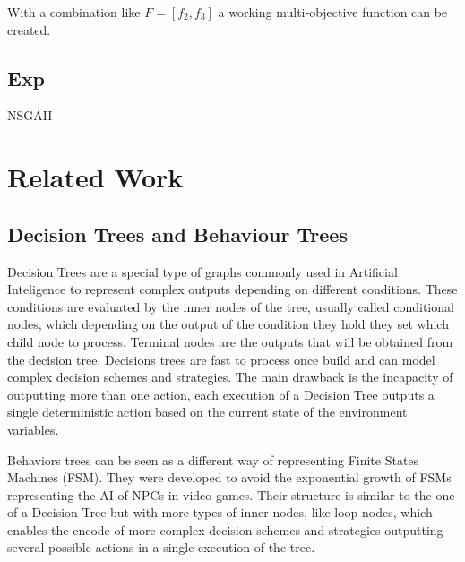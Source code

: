 \documentclass{llncs}
\begin{document}
With a combination like $F = [f_2, f_3]$ a working multi-objective function can be created.

\subsection{Exp}
NSGAII

%
\section{Related Work}
\label{sec:relatedWork}
%

\subsection{Decision Trees and Behaviour Trees}
Decision Trees are a special type of graphs commonly used in Artificial Inteligence to represent complex outputs depending on different conditions. These conditions are evaluated by the inner nodes of the tree, usually called conditional nodes, which depending on the output of the condition they hold they set which child node to process. Terminal nodes are the outputs that will be obtained from the decision tree. 
Decisions trees are fast to process once build and can model complex decision schemes and strategies. The main drawback is the incapacity of outputting more than one action, each execution of a Decision Tree outputs a single deterministic action based on the current state of the environment variables.

Behaviors trees can be seen as a different way of representing Finite States Machines (FSM). They were developed to avoid the exponential growth of FSMs representing the AI of NPCs in video games. Their structure is similar to the one of a Decision Tree but with more types of inner nodes, like loop nodes, which enables the encode of more complex decision schemes and strategies outputting several possible actions in a single execution of the tree.
\end{document}
